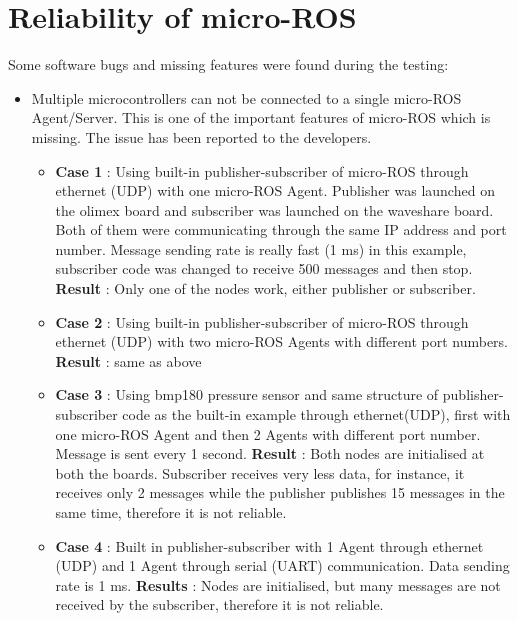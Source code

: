 \documentclass[%
xelatex,
	oneside,		%
	12pt,			%
	parskip=half,	%
	abstracton,
	chapterprefix=true%
    appendixprefix=true]
{scrbook}
\begin{document}
		\section{Reliability of micro-ROS}
		\vspace*{0.5cm}
		Some software bugs and missing features were found during the testing:
	\begin{itemize}	
	\item Multiple microcontrollers can not be connected to a single micro-ROS Agent/Server. This is one of the important features of micro-ROS which is missing. The issue has been reported to the developers.
\begin{itemize}
\item {\bfseries Case 1} : Using built-in publisher-subscriber of micro-ROS through ethernet (UDP) with one micro-ROS Agent. 
Publisher was launched on the olimex board and subscriber was launched on the waveshare board. Both of them were communicating through the same IP address and port number. Message sending rate is really fast (1 ms) in this example, subscriber code was changed to receive 500 messages and then stop. \linebreak
{\bfseries Result} : Only one of the nodes work, either publisher or subscriber.

\item {\bfseries Case 2} : Using built-in publisher-subscriber of micro-ROS through ethernet (UDP) with two micro-ROS Agents with different port numbers.\linebreak
{\bfseries Result} : same as above

\item {\bfseries Case 3} : Using bmp180 pressure sensor and same structure of publisher-subscriber code as the built-in example through ethernet(UDP), first with one micro-ROS Agent and then 2 Agents with different port number.
Message is sent every 1 second.\linebreak
{\bfseries Result} : Both nodes are initialised at both the boards. Subscriber receives very less data, for instance, it receives only 2 messages while the publisher publishes 15 messages in the same time, therefore it is not reliable.

\item {\bfseries Case 4} : Built in publisher-subscriber with 1 Agent through ethernet (UDP) and 1 Agent through serial (UART) communication.
Data sending rate is 1 ms.\linebreak
{\bfseries Results} : Nodes are initialised, but many messages are not received by the subscriber, therefore it is not reliable.


\end{itemize}
\end{itemize}
\end{document}
